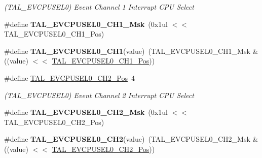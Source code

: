 \begin{DoxyCompactItemize}
\begin{DoxyCompactList}\small\item\em (T\+A\+L\+\_\+\+E\+V\+C\+P\+U\+S\+E\+L0) Event Channel 1 Interrupt C\+P\+U Select \end{DoxyCompactList}\item 
\hypertarget{group___s_a_m_l21___t_a_l_ga480c1e3381a7967761703d2ae7920607}{}\#define {\bfseries T\+A\+L\+\_\+\+E\+V\+C\+P\+U\+S\+E\+L0\+\_\+\+C\+H1\+\_\+\+Msk}~(0x1ul $<$$<$ T\+A\+L\+\_\+\+E\+V\+C\+P\+U\+S\+E\+L0\+\_\+\+C\+H1\+\_\+\+Pos)\label{group___s_a_m_l21___t_a_l_ga480c1e3381a7967761703d2ae7920607}

\item 
\hypertarget{group___s_a_m_l21___t_a_l_ga4ef4e96c1f6f76c42c58479d3bdaf244}{}\#define {\bfseries T\+A\+L\+\_\+\+E\+V\+C\+P\+U\+S\+E\+L0\+\_\+\+C\+H1}(value)~(T\+A\+L\+\_\+\+E\+V\+C\+P\+U\+S\+E\+L0\+\_\+\+C\+H1\+\_\+\+Msk \& ((value) $<$$<$ \hyperlink{group___s_a_m_l21___t_a_l_ga8ce38fd8ecfd46bdbdd12ef79f7bca49}{T\+A\+L\+\_\+\+E\+V\+C\+P\+U\+S\+E\+L0\+\_\+\+C\+H1\+\_\+\+Pos}))\label{group___s_a_m_l21___t_a_l_ga4ef4e96c1f6f76c42c58479d3bdaf244}

\item 
\hypertarget{group___s_a_m_l21___t_a_l_gaf56b37a9e7ba1ad37d9f541b27af47c8}{}\#define \hyperlink{group___s_a_m_l21___t_a_l_gaf56b37a9e7ba1ad37d9f541b27af47c8}{T\+A\+L\+\_\+\+E\+V\+C\+P\+U\+S\+E\+L0\+\_\+\+C\+H2\+\_\+\+Pos}~4\label{group___s_a_m_l21___t_a_l_gaf56b37a9e7ba1ad37d9f541b27af47c8}

\begin{DoxyCompactList}\small\item\em (T\+A\+L\+\_\+\+E\+V\+C\+P\+U\+S\+E\+L0) Event Channel 2 Interrupt C\+P\+U Select \end{DoxyCompactList}\item 
\hypertarget{group___s_a_m_l21___t_a_l_ga1142c3eb30d9653c2faabb8625f2188f}{}\#define {\bfseries T\+A\+L\+\_\+\+E\+V\+C\+P\+U\+S\+E\+L0\+\_\+\+C\+H2\+\_\+\+Msk}~(0x1ul $<$$<$ T\+A\+L\+\_\+\+E\+V\+C\+P\+U\+S\+E\+L0\+\_\+\+C\+H2\+\_\+\+Pos)\label{group___s_a_m_l21___t_a_l_ga1142c3eb30d9653c2faabb8625f2188f}

\item 
\hypertarget{group___s_a_m_l21___t_a_l_ga899b216e94dac26dd0c76aa76e9982e1}{}\#define {\bfseries T\+A\+L\+\_\+\+E\+V\+C\+P\+U\+S\+E\+L0\+\_\+\+C\+H2}(value)~(T\+A\+L\+\_\+\+E\+V\+C\+P\+U\+S\+E\+L0\+\_\+\+C\+H2\+\_\+\+Msk \& ((value) $<$$<$ \hyperlink{group___s_a_m_l21___t_a_l_gaf56b37a9e7ba1ad37d9f541b27af47c8}{T\+A\+L\+\_\+\+E\+V\+C\+P\+U\+S\+E\+L0\+\_\+\+C\+H2\+\_\+\+Pos}))\label{group___s_a_m_l21___t_a_l_ga899b216e94dac26dd0c76aa76e9982e1}


\end{DoxyCompactItemize}
